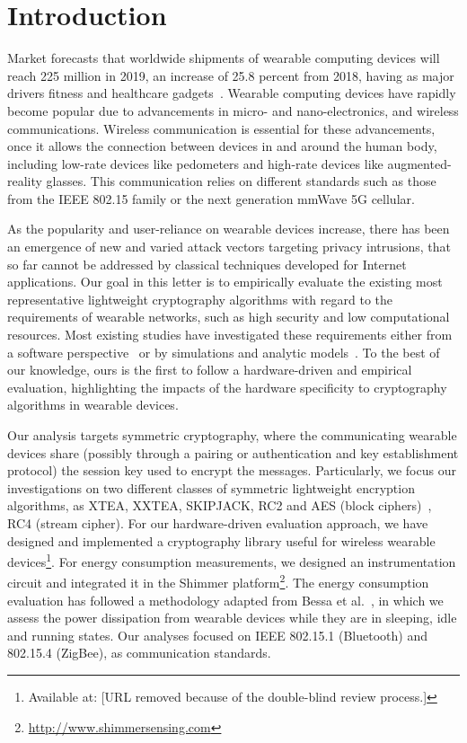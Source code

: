 \documentclass[journal]{IEEEtran}
\begin{document}
\IEEEpeerreviewmaketitle

\section{Introduction}
%

Market forecasts that worldwide shipments of wearable computing devices will reach 225 million in 2019, an increase of 25.8 percent from 2018, having as major drivers
fitness and healthcare gadgets~\cite{Li:2018}. Wearable computing devices have rapidly become popular due to advancements in micro- and nano-electronics, and wireless communications. Wireless communication is essential for these advancements, once it allows the connection between devices in and around the human body, including low-rate devices like pedometers and high-rate devices like augmented-reality glasses. This communication relies on different standards such as those from the IEEE 802.15 family or the next generation mmWave 5G cellular. 

As the popularity and user-reliance on wearable devices increase, there has been an emergence of new and varied attack vectors targeting privacy intrusions, that so far cannot be addressed by classical techniques developed for Internet applications. Our goal in this letter is to empirically evaluate the existing most representative lightweight cryptography algorithms with regard to the requirements of wearable networks, such as high security and low computational resources. Most existing studies have investigated these requirements either from a software perspective~\cite{eisenbarth2012compact,kerckhof2012towards,eisenbarth2007survey} or by simulations and analytic models~\cite{cazorla2013survey,el2017equalized}. To the best of our knowledge, ours is the first to follow a hardware-driven and empirical evaluation, highlighting the impacts of the hardware specificity to cryptography algorithms in wearable devices.

Our analysis targets symmetric cryptography, where the communicating wearable devices share (possibly through a pairing or authentication and key establishment protocol) the session key used to encrypt the messages. Particularly, we focus our investigations on two different classes of symmetric lightweight encryption algorithms, as XTEA, XXTEA, SKIPJACK, RC2 and AES (block ciphers)~\cite{Moh:2015}, RC4 (stream cipher). For our hardware-driven evaluation approach, we have designed and implemented a cryptography library useful for wireless wearable devices\footnote{Available at: [URL removed because of the double-blind review process.]%
}. For energy consumption measurements, we designed an instrumentation circuit and integrated it in the Shimmer platform\footnote{\url{http://www.shimmersensing.com}
}. The energy consumption evaluation has followed a methodology adapted from Bessa et al.~\cite{bessa2017jetsonleap}, in which we assess the power dissipation from wearable devices while they are in sleeping, idle and running states. Our analyses focused on IEEE 802.15.1 (Bluetooth) and 802.15.4 (ZigBee), as communication standards. 
\end{document}
